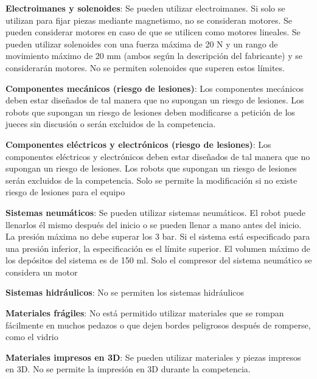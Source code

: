 \documentclass[12pt,a4paper]{article}
\begin{document}
\textbf{Electroimanes y solenoides}: Se pueden utilizar electroimanes. Si solo se utilizan para fijar piezas mediante magnetismo, no se consideran motores. Se pueden considerar motores en caso de que se utilicen como motores lineales. Se pueden utilizar solenoides con una fuerza máxima de 20 N y un rango de movimiento máximo de 20 mm (ambos según la descripción del fabricante) y se considerarán motores. No se permiten solenoides que superen estos límites.

\textbf{Componentes mecánicos (riesgo de lesiones)}: Los componentes mecánicos deben estar diseñados de tal manera que no supongan un riesgo de lesiones. Los robots que supongan un riesgo de lesiones deben modificarse a petición de los jueces sin discusión o serán excluidos de la competencia.

\textbf{Componentes eléctricos y electrónicos (riesgo de lesiones)}: Los componentes eléctricos y electrónicos deben estar diseñados de tal manera que no supongan un riesgo de lesiones. Los robots que supongan un riesgo de lesiones serán excluidos de la competencia. Solo se permite la modificación si no existe riesgo de lesiones para el equipo

\textbf{Sistemas neumáticos}: Se pueden utilizar sistemas neumáticos. El robot puede llenarlos él mismo después del inicio o se pueden llenar a mano antes del inicio. La presión máxima no debe superar los 3 bar. Si el sistema está especificado para una presión inferior, la especificación es el límite superior. El volumen máximo de los depósitos del sistema es de 150 ml. Solo el compresor del sistema neumático se considera un motor

\textbf{Sistemas hidráulicos}: No se permiten los sistemas hidráulicos

\textbf{Materiales frágiles}: No está permitido utilizar materiales que se rompan fácilmente en muchos pedazos o que dejen bordes peligrosos después de romperse, como el vidrio

\textbf{Materiales impresos en 3D}: Se pueden utilizar materiales y piezas impresos en 3D. No se permite la impresión en 3D durante la competencia.


\vspace{0.5cm}
\end{document}
